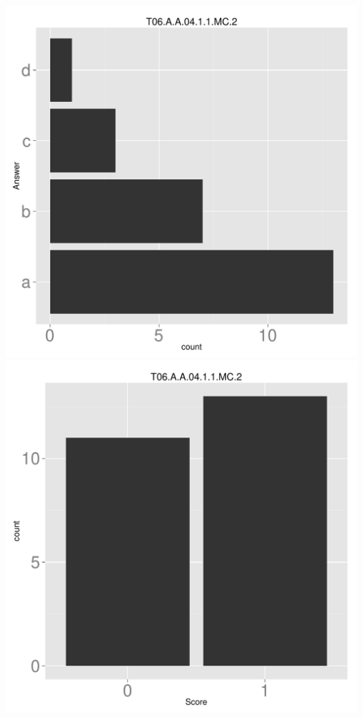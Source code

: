 \documentclass[12pt,nohyper]{tufte-handout}\usepackage[]{graphicx}\usepackage[]{color}
\begin{document}
\begin{center} \includegraphics[width=.45\linewidth]{Topic06_2_answer} \includegraphics[width=.45\linewidth]{Topic06_2_score} \end{center} 
\end{document}
